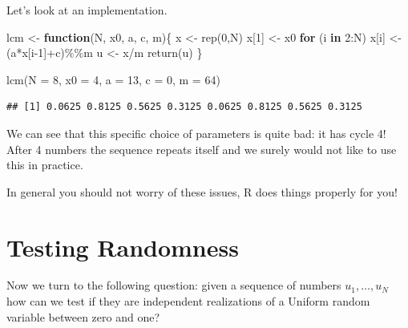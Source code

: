 \documentclass[
]{book}
\newenvironment{Shaded}{\begin{snugshade}}{\end{snugshade}}
\newcommand{\AttributeTok}[1]{\textcolor[rgb]{0.77,0.63,0.00}{#1}}
\newcommand{\ControlFlowTok}[1]{\textcolor[rgb]{0.13,0.29,0.53}{\textbf{#1}}}
\newcommand{\DecValTok}[1]{\textcolor[rgb]{0.00,0.00,0.81}{#1}}
\newcommand{\FunctionTok}[1]{\textcolor[rgb]{0.00,0.00,0.00}{#1}}
\newcommand{\NormalTok}[1]{#1}
\newcommand{\OtherTok}[1]{\textcolor[rgb]{0.56,0.35,0.01}{#1}}
\newcommand{\SpecialCharTok}[1]{\textcolor[rgb]{0.00,0.00,0.00}{#1}}
\begin{document}
Let's look at an implementation.

\begin{Shaded}
\begin{Highlighting}[]
\NormalTok{lcm }\OtherTok{\textless{}{-}} \ControlFlowTok{function}\NormalTok{(N, x0, a, c, m)\{}
\NormalTok{   x }\OtherTok{\textless{}{-}} \FunctionTok{rep}\NormalTok{(}\DecValTok{0}\NormalTok{,N)}
\NormalTok{   x[}\DecValTok{1}\NormalTok{] }\OtherTok{\textless{}{-}}\NormalTok{ x0}
   \ControlFlowTok{for}\NormalTok{ (i }\ControlFlowTok{in} \DecValTok{2}\SpecialCharTok{:}\NormalTok{N) x[i] }\OtherTok{\textless{}{-}}\NormalTok{ (a}\SpecialCharTok{*}\NormalTok{x[i}\DecValTok{{-}1}\NormalTok{]}\SpecialCharTok{+}\NormalTok{c)}\SpecialCharTok{\%\%}\NormalTok{m}
\NormalTok{   u }\OtherTok{\textless{}{-}}\NormalTok{ x}\SpecialCharTok{/}\NormalTok{m}
   \FunctionTok{return}\NormalTok{(u)}
\NormalTok{\}}
\end{Highlighting}
\end{Shaded}

\begin{Shaded}
\begin{Highlighting}[]
\FunctionTok{lcm}\NormalTok{(}\AttributeTok{N =} \DecValTok{8}\NormalTok{, }\AttributeTok{x0 =} \DecValTok{4}\NormalTok{, }\AttributeTok{a =} \DecValTok{13}\NormalTok{, }\AttributeTok{c =} \DecValTok{0}\NormalTok{, }\AttributeTok{m =} \DecValTok{64}\NormalTok{)}
\end{Highlighting}
\end{Shaded}

\begin{verbatim}
## [1] 0.0625 0.8125 0.5625 0.3125 0.0625 0.8125 0.5625 0.3125
\end{verbatim}

We can see that this specific choice of parameters is quite bad: it has cycle 4! After 4 numbers the sequence repeats itself and we surely would not like to use this in practice.

In general you should not worry of these issues, R does things properly for you!

\hypertarget{testing-randomness}{%
\section{Testing Randomness}\label{testing-randomness}}

Now we turn to the following question: given a sequence of numbers \(u_1,\dots,u_N\) how can we test if they are independent realizations of a Uniform random variable between zero and one?
\end{document}
